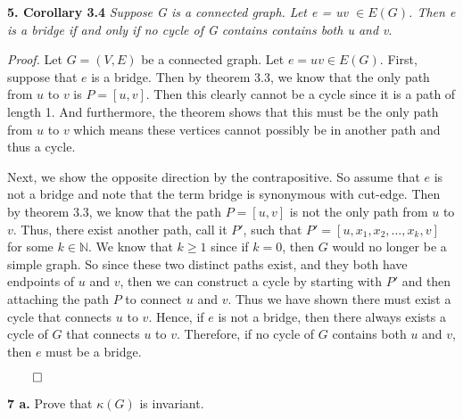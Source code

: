 \documentclass{article}
\begin{document}
\newpage
\textbf{5. Corollary 3.4} \textit{ Suppose G is a connected graph. Let e = uv \( \in E(G)\). Then e is a bridge if and only if no cycle of G contains contains both u and v}.
\vspace{2mm}

\textit{Proof.} Let \(G=(V,E)\) be a connected graph. Let \(e = uv \in E(G) \). First, suppose that \(e\) is a bridge. Then by theorem 3.3, we know that the only path from \(u\) to \(v\) is \(P=[u,v]\). Then this clearly cannot be a cycle since it is a path of length 1. And furthermore, the theorem shows that this must be the only path from \(u\) to \(v\) which means these vertices cannot possibly be in another path and thus a cycle. 

Next, we show the opposite direction by the contrapositive. So assume that \(e\) is not a bridge and note that the term bridge is synonymous with cut-edge. Then by theorem 3.3, we know that the path \(P=[u,v]\) is not the only path from \(u\) to \(v\). Thus, there exist another path, call it \(P'\), such that \(P' = [ u, x_1, x_2, \dots, x_k, v] \) for some \( k \in \mathbb{N}\). We know that \(k\geq1\) since if \(k=0\), then \(G\) would no longer be a simple graph. So since these two distinct paths exist, and they both have endpoints of \(u\) and \(v\), then we can construct a cycle by starting with \(P'\) and then attaching the path \(P\) to connect \(u\) and \(v\). Thus we have shown there must exist a cycle that connects \(u\) to \(v\). Hence, if \(e\) is not a bridge, then there always exists a cycle of \(G\) that connects \(u\) to \(v\). Therefore, if no cycle of \(G\) contains both \(u\) and \(v\), then \(e\) must be a bridge. 

\begin{flushright}
 \(\qed\) 
\end{flushright}



\vspace{4mm}


\vspace{4mm}

\textbf{7 a.} Prove that \(\kappa(G)\) is invariant. 

\vspace{2mm}
\end{document}
